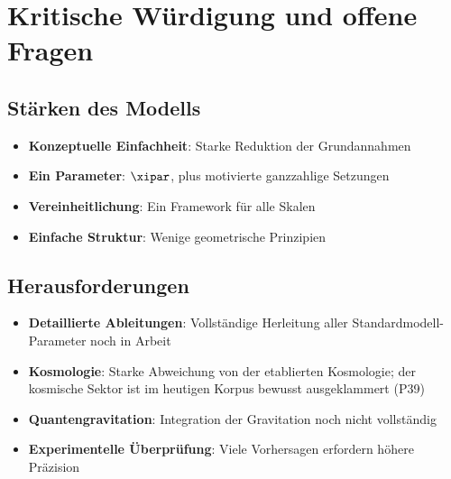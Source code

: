 	\section{Kritische Würdigung und offene Fragen}
	
	\subsection{Stärken des Modells}
	
	\begin{itemize}
		\item \textbf{Konzeptuelle Einfachheit}: Starke Reduktion der Grundannahmen
		\item \textbf{Ein Parameter}: $\xipar$, plus motivierte ganzzahlige Setzungen

		\item \textbf{Vereinheitlichung}: Ein Framework für alle Skalen
		\item \textbf{Einfache Struktur}: Wenige geometrische Prinzipien
	\end{itemize}
	
	\subsection{Herausforderungen}
	
	\begin{itemize}
		\item \textbf{Detaillierte Ableitungen}: Vollständige Herleitung aller Standardmodell-Parameter noch in Arbeit
		\item \textbf{Kosmologie}: Starke Abweichung von der etablierten Kosmologie; der kosmische Sektor ist im heutigen Korpus bewusst ausgeklammert (P39)
		\item \textbf{Quantengravitation}: Integration der Gravitation noch nicht vollständig
		\item \textbf{Experimentelle Überprüfung}: Viele Vorhersagen erfordern höhere Präzision
	\end{itemize}
	